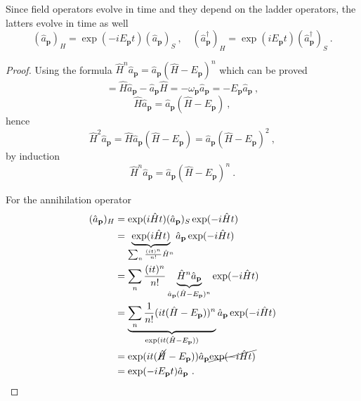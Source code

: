     Since field operators evolve in time and they depend on the ladder operators, the latters evolve in time as well 
    \begin{equation*}
        (\hat a_{\mathbf p})_H = \exp(- i E_{\mathbf p} t) (\hat a_{\mathbf p})_S ~, \quad (\hat a^\dagger_{\mathbf p})_H = \exp(i E_{\mathbf p} t) (\hat a^\dagger_{\mathbf p})_S~.
    \end{equation*}
    \begin{proof}
        Using the formula $ \hat H^n \hat a_{\mathbf p} = \hat a_{\mathbf p} (\hat H - E_{\mathbf p})^n$ which can be proved 
        \begin{equation*}
            [\hat H, \hat a_{\mathbf p}] = \hat H \hat a_{\mathbf p} - \hat a_{\mathbf p} \hat H = - \omega_{\mathbf p} \hat a_{\mathbf p} = - E_{\mathbf p} \hat a_{\mathbf p} ~,
        \end{equation*}
        \begin{equation*}
            \hat H \hat a_{\mathbf p} = \hat a_{\mathbf p} (\hat H - E_{\mathbf p}) ~,
        \end{equation*}
        hence 
        \begin{equation}
            \hat H^2 \hat a_{\mathbf p} = \hat H \hat a_{\mathbf p} (\hat H - E_{\mathbf p}) = \hat a_{\mathbf p} (\hat H - E_{\mathbf p})^2 ~,
        \end{equation}
        by induction 
        \begin{equation*}
            \hat H^n \hat a_{\mathbf p} = \hat a_{\mathbf p} (\hat H - E_{\mathbf p})^n ~.
        \end{equation*}

        For the annihilation operator 
        \begin{equation*}
        \begin{aligned}
            (\hat a_{\mathbf p})_H & = \exp(i \hat H t) (\hat a_{\mathbf p})_S \exp(- i \hat H t) \\ & = \underbrace{\exp(i \hat H t)}_{\sum_n \frac{(i t)^n}{n!} \hat H^n} \hat a_{\mathbf p} \exp(- i \hat H t) \\ & = \sum_n \frac{(i t)^n}{n!} \underbrace{\hat H^n \hat a_{\mathbf p}}_{\hat a_{\mathbf p} (\hat H - E_{\mathbf p})^n} \exp(- i \hat H t) \\ & = \underbrace{\sum_n \frac{1}{n!}  (i t (\hat H - E_{\mathbf p}))^n }_{\exp(i t (\hat H - E_{\mathbf p}))}  \hat a_{\mathbf p} \exp(- i \hat H t) \\ & = \exp(i t (\cancel{\hat H} - E_{\mathbf p})) \hat a_{\mathbf p} \cancel{\exp(- i \hat H t)} \\ & = \exp(- i E_{\mathbf p} t) \hat a_{\mathbf p} ~.
        \end{aligned}
        \end{equation*}


\end{proof}
